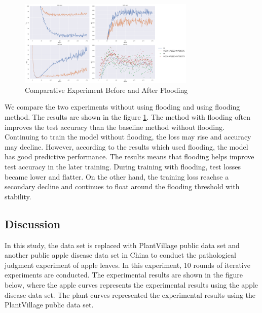 \documentclass[a4paper,fleqn]{cas-sc}
\begin{document}
\begin{figure}
\centering
\includegraphics[width=0.75\textwidth]{figs_rev1/f8.png}
\caption{Comparative Experiment Before and After Flooding}
\label{fig:f78}
\end{figure}

We compare the two experiments without using flooding and using flooding method. The results are shown in the figure \ref{fig:f78}. The method with flooding often improves the test accuracy than the baseline method without flooding. Continuing to train the model without flooding, the loss may rise and accuracy may decline. However, according to the results which used flooding, the model has good predictive performance. The results means that flooding helps improve test accuracy in the later training. During training with flooding, test losses became lower and flatter. On the other hand, the training loss reachse a secondary decline and continues to float around the flooding threshold with stability.

\subsection{Discussion}
In this study, the data set is replaced with PlantVillage public data set and another public apple disease data set in China to conduct the pathological judgment experiment of apple leaves. In this experiment, 10 rounds of iterative experiments are conducted. The experimental results are shown in the figure below, where the apple curves represents the experimental results using the apple disease data set. The plant curves represented the experimental results using the PlantVillage public data set. 
\end{document}
